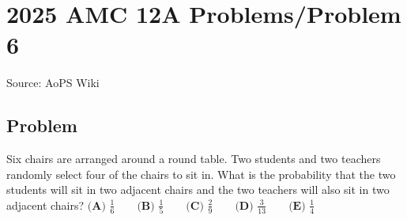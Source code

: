 \documentclass[12pt]{article}
\begin{document}
\section*{{2025 AMC 12A Problems/Problem 6}}
Source: AoPS Wiki

\subsection*{Problem}
Six chairs are arranged around a round table. Two students and two teachers randomly select four of the chairs to sit in. What is the probability that the two students will sit in two adjacent chairs and the two teachers will also sit in two adjacent chairs? $\textbf{(A) } \frac 16 \qquad \textbf{(B) } \frac 15 \qquad \textbf{(C) } \frac 29 \qquad \textbf{(D) } \frac 3{13} \qquad \textbf{(E) } \frac 14$
\end{document}
